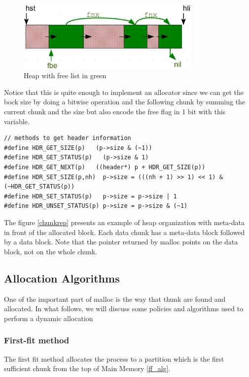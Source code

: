\begin{figure}[htbp]
    \begin{center}
        \includegraphics[width=0.8\textwidth]{figures/freelist}
    \caption{Heap with free list in green}
    \label{freelist}
    \end{center}
\end{figure}

Notice that this is quite enough to implement an allocator since we can get the bock size by doing a bitwise operation and the following chunk by summing the current chunk and the size but also encode the free flag in 1 bit with this variable.

\begin{lstlisting}[style=cstyle]
// methods to get header information
#define HDR_GET_SIZE(p)   (p->size & (~1))
#define HDR_GET_STATUS(p)   (p->size & 1)
#define HDR_GET_NEXT(p)   ((header*) p + HDR_GET_SIZE(p))
#define HDR_SET_SIZE(p,nh)  p->size = (((nh + 1) >> 1) << 1) & (~HDR_GET_STATUS(p))
#define HDR_SET_STATUS(p)   p->size = p->size | 1
#define HDR_UNSET_STATUS(p) p->size = p->size & (~1)
\end{lstlisting}

The figure \ref{chunkrep} presents an example of heap organization with meta-data in front of the allocated block. Each data chunk has a meta-data block followed by a data block. Note that the pointer returned by malloc points on the data block, not on the whole chunk.\\

\subsection{Allocation Algorithms}
  One of the important part of malloc is the way that thunk are found and allocated. In what follows, we will discuss some policies and algorithms used to perform a dynamic allocation
\subsubsection{First-fit method}
The first fit method allocates the process to a partition which is the first sufficient chunk from the top of Main Memory \ref{ff_alg}.

